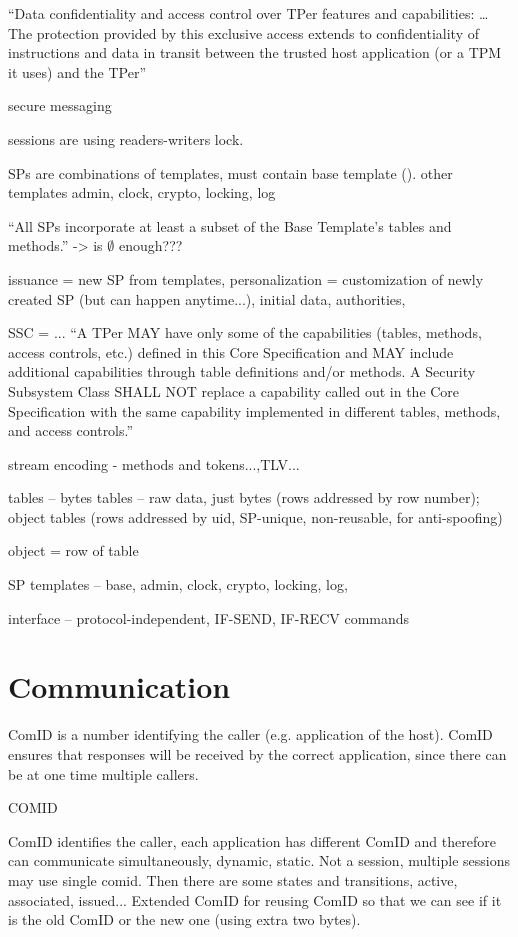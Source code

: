 \documentclass[
  digital, %
  oneside, %
  nolof,     %
  nolot,     %
]{fithesis4}
\begin{document}
``Data confidentiality and access control over TPer features and capabilities: \dots The protection provided by this
exclusive access extends to confidentiality of instructions and data in transit between the
trusted host application (or a TPM it uses) and the TPer''


secure messaging

sessions are using readers-writers lock.

SPs are combinations of templates, must contain base template (). other templates admin, clock, crypto, locking, log

``All SPs incorporate at least a subset of the Base Template’s tables and methods.'' -> is $\emptyset$ enough???

issuance = new SP from templates, personalization = customization of newly created SP (but can happen anytime...), initial data, authorities, 

SSC = ... ``A TPer MAY have only some of the capabilities (tables, methods, access controls, etc.) defined in this
Core Specification and MAY include additional capabilities through table definitions and/or methods. A
Security Subsystem Class SHALL NOT replace a capability called out in the Core Specification with the
same capability implemented in different tables, methods, and access controls.''

stream encoding - methods and tokens...,TLV...

tables -- bytes tables -- raw data, just bytes (rows addressed by row number); object tables (rows addressed by uid, SP-unique, non-reusable, for anti-spoofing)

object = row of table

SP templates -- base, admin, clock, crypto, locking, log,


interface -- protocol-independent, IF-SEND, IF-RECV commands 

\hline

\section{Communication}

ComID is a number identifying the caller (e.g. application of the host). ComID ensures that responses will be received by the correct application, since there can be at one time multiple callers.


\hline

COMID

ComID identifies the caller, each application has different ComID and therefore can communicate simultaneously, dynamic, static. Not a session, multiple sessions may use single comid. Then there are some states and transitions, active, associated, issued... Extended ComID for reusing ComID so that we can see if it is the old ComID or the new one (using extra two bytes).
\end{document}
